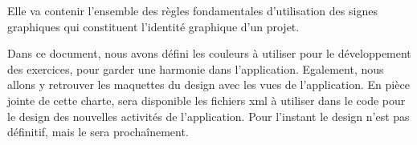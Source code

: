 Elle va contenir l'ensemble des règles fondamentales d'utilisation des signes graphiques qui constituent l'identité graphique d'un projet.


Dans ce document, nous avons défini les couleurs à utiliser pour le développement des exercices, pour garder une harmonie dans l'application. Egalement, nous allons y retrouver les maquettes du design avec les vues de l'application. En pièce jointe de cette charte, sera disponible les fichiers xml à utiliser dans le code pour le design des nouvelles activités de l'application. Pour l'instant le design n'est pas définitif, mais le sera prochaînement.